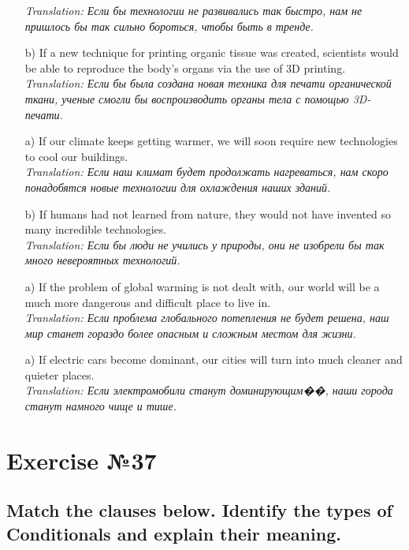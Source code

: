 \begin{enumerate}
            \textit{Translation: Если бы технологии не развивались так быстро, нам не пришлось бы так сильно бороться, чтобы быть в тренде.}
      \item[b)] If a new technique for printing organic tissue was created, scientists would be able to reproduce the body’s organs via the use of 3D printing.\\
            \textit{Translation: Если бы была создана новая техника для печати органической ткани, ученые смогли бы воспроизводить органы тела с помощью 3D-печати.}
      \item[a)] If our climate keeps getting warmer, we will soon require new technologies to cool our buildings.\\
            \textit{Translation: Если наш климат будет продолжать нагреваться, нам скоро понадобятся новые технологии для охлаждения наших зданий.}
      \item[b)] If humans had not learned from nature, they would not have invented so many incredible technologies.\\
            \textit{Translation: Если бы люди не учились у природы, они не изобрели бы так много невероятных технологий.}
      \item[a)] If the problem of global warming is not dealt with, our world will be a much more dangerous and difficult place to live in.\\
            \textit{Translation: Если проблема глобального потепления не будет решена, наш мир станет гораздо более опасным и сложным местом для жизни.}
      \item[a)] If electric cars become dominant, our cities will turn into much cleaner and quieter places.\\
            \textit{Translation: Если электромобили станут доминирующим��, наши города станут намного чище и тише.}
\end{enumerate}

\section{Exercise №37}
\subsection*{Match the clauses below. Identify the types of Conditionals and explain their meaning.}

